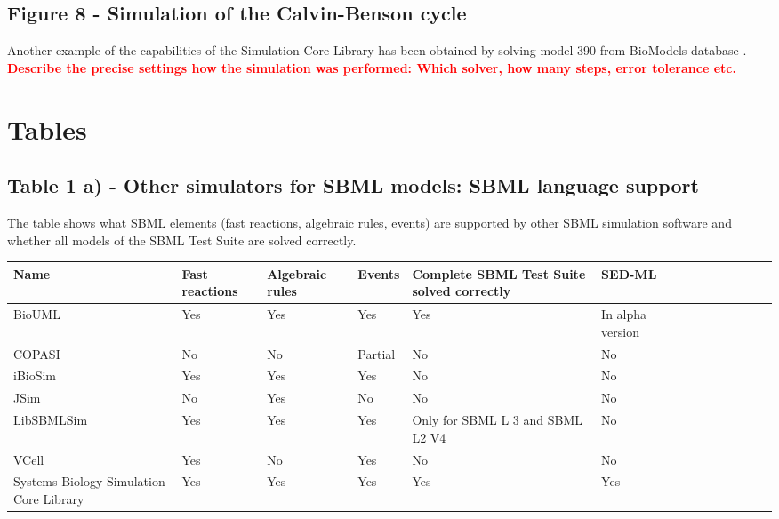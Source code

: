 \documentclass[10pt]{bmc_article}
\newenvironment{bmcformat}{\baselineskip20pt\sloppy\setboolean{publ}{false}}{\baselineskip20pt\sloppy}
\newcommand{\TODO}[1]{\textcolor{red}{\textbf{#1}}}
\begin{document}
\begin{bmcformat}
\subsection*{Figure 8 - Simulation of the Calvin-Benson cycle}
Another example of the capabilities of the Simulation Core Library has been obtained by solving model 390 from BioModels database \cite{Novere2006a, Arnold2011}.
\TODO{Describe the precise settings how the simulation was performed: Which solver, how many steps, error tolerance etc.}



\section*{Tables}

  \subsection*{Table 1 a) - Other simulators for SBML models: SBML language support}
    The table shows what SBML elements (fast reactions, algebraic rules, events) are supported by other SBML simulation software and whether all models of the SBML Test Suite are solved correctly. 
	\par \mbox{}
\begin{landscape}
      \begin{tabular}{|l|l|l|l|l|l|l|l|l|l|l|l|l|l|}
\hline
Name 	& Fast reactions & Algebraic rules& Events &Complete SBML Test Suite solved correctly&SED-ML\\\hline
BioUML & Yes& Yes& Yes&Yes&In alpha version\\\hline
COPASI &No & No & Partial &No&No\\\hline
iBioSim &Yes&Yes&Yes&No& No\\\hline
JSim & No & Yes & No &No& No\\\hline
LibSBMLSim &Yes& Yes & Yes&Only for SBML L 3 and SBML L2 V4& No\\\hline
VCell &Yes& No &Yes&No& No\\\hline
Systems Biology Simulation Core Library &Yes& Yes &Yes&Yes& Yes\\\hline
 \end{tabular}
\end{landscape}


\end{bmcformat}
\end{document}
